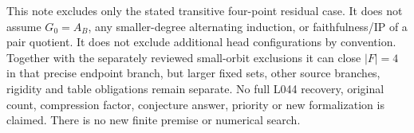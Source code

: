 \documentclass[11pt,a4paper]{article}
\begin{document}
This note excludes only the stated transitive four-point residual case.
It does not assume $G_0=A_B$, any smaller-degree alternating induction,
or faithfulness/IP of a pair quotient. It does not exclude additional
head configurations by convention. Together with the separately reviewed
small-orbit exclusions it can close $|F|=4$ in that precise endpoint
branch, but larger fixed sets, other source branches, rigidity and table
obligations remain separate. No full L044 recovery, original count,
compression factor, conjecture answer, priority or new formalization is
claimed. There is no new finite premise or numerical search.
\end{document}
